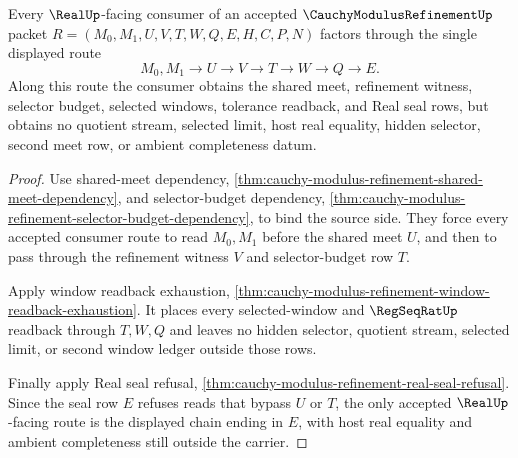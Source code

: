 \begin{theorem}
\label{thm:cauchy-modulus-refinement-shared-route-totality}
Every $\RealUp$-facing consumer of an accepted $\CauchyModulusRefinementUp$ packet $R=(M_0,M_1,U,V,T,W,Q,E,H,C,P,N)$ factors through the single displayed route
$$
M_0,M_1 \longrightarrow U \longrightarrow V \longrightarrow T \longrightarrow W \longrightarrow Q \longrightarrow E.
$$
Along this route the consumer obtains the shared meet, refinement witness, selector budget, selected windows, tolerance readback, and Real seal rows, but obtains no quotient stream, selected limit, host real equality, hidden selector, second meet row, or ambient completeness datum.
\end{theorem}
\begin{proof}
Use shared-meet dependency, \autoref{thm:cauchy-modulus-refinement-shared-meet-dependency}, and selector-budget dependency, \autoref{thm:cauchy-modulus-refinement-selector-budget-dependency}, to bind the source side. They force every accepted consumer route to read $M_0,M_1$ before the shared meet $U$, and then to pass through the refinement witness $V$ and selector-budget row $T$.

Apply window readback exhaustion, \autoref{thm:cauchy-modulus-refinement-window-readback-exhaustion}. It places every selected-window and $\RegSeqRatUp$ readback through $T,W,Q$ and leaves no hidden selector, quotient stream, selected limit, or second window ledger outside those rows.

Finally apply Real seal refusal, \autoref{thm:cauchy-modulus-refinement-real-seal-refusal}. Since the seal row $E$ refuses reads that bypass $U$ or $T$, the only accepted $\RealUp$-facing route is the displayed chain ending in $E$, with host real equality and ambient completeness still outside the carrier.
\end{proof}

